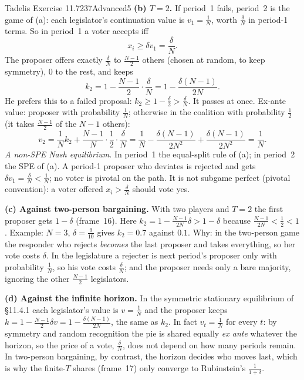 \begin{exsol}{Tadelis Exercise 11.7}{237}{Advanced}{5}
\textbf{(b) $T = 2$.} If period~1 fails, period~2 is the game of (a): each legislator's continuation value
is $v_1 = \frac1N$, worth $\frac{\delta}{N}$ in period-1 terms. So in period~1 a voter accepts iff
\[
  x_i \ge \delta v_1 = \frac{\delta}{N}.
\]
The proposer offers exactly $\frac{\delta}{N}$ to $\frac{N-1}{2}$ others (chosen at random, to keep
symmetry), $0$ to the rest, and keeps
\[
  k_2 = 1 - \frac{N-1}{2}\cdot\frac{\delta}{N} = 1 - \frac{\delta(N-1)}{2N}.
\]
He prefers this to a failed proposal: $k_2 \ge 1 - \frac{\delta}{2} > \frac{\delta}{N}$. It passes at once.
Ex-ante value: proposer with probability $\frac1N$; otherwise in the coalition with probability
$\frac12$ (it takes $\frac{N-1}{2}$ of the $N - 1$ others):
\[
  v_2 = \frac1N k_2 + \frac{N-1}{N}\cdot\frac12\cdot\frac{\delta}{N}
  = \frac1N - \frac{\delta(N-1)}{2N^2} + \frac{\delta(N-1)}{2N^2} = \frac1N .
\]
\emph{A non-SPE Nash equilibrium.} In period~1 the equal-split rule of (a); in period~2 the SPE of (a). A
period-1 proposer who deviates is rejected and gets $\delta v_1 = \frac{\delta}{N} < \frac1N$; no voter is
pivotal on the path. It is not subgame perfect (pivotal convention): a voter offered $x_i > \frac{\delta}{N}$
should vote yes.

\textbf{(c) Against two-person bargaining.} With two players and $T = 2$ the first proposer gets
$1 - \delta$ (frame~16). Here $k_2 = 1 - \frac{N-1}{2N}\delta > 1 - \delta$ because $\frac{N-1}{2N} < \frac12
< 1$. Example: $N = 3$, $\delta = \frac9{10}$ gives $k_2 = 0.7$ against $0.1$. Why: in the two-person game
the responder who rejects \emph{becomes} the last proposer and takes everything, so her vote costs
$\delta$. In the legislature a rejecter is next period's proposer only with probability $\frac1N$, so his
vote costs $\frac{\delta}{N}$; and the proposer needs only a bare majority, ignoring the other
$\frac{N-1}{2}$ legislators.

\textbf{(d) Against the infinite horizon.} In the symmetric stationary equilibrium of \S11.4.1 each
legislator's value is $v = \frac1N$ and the proposer keeps $k = 1 - \frac{N-1}{2}\delta v = 1 -
\frac{\delta(N-1)}{2N}$, the same as $k_2$. In fact $v_t = \frac1N$ for every $t$: by symmetry and random
recognition the pie is shared equally \emph{ex ante} whatever the horizon, so the price of a vote,
$\frac{\delta}{N}$, does not depend on how many periods remain. In two-person bargaining, by contrast, the
horizon decides who moves last, which is why the finite-$T$ shares (frame~17) only converge to
Rubinstein's $\frac1{1+\delta}$.


\end{exsol}
